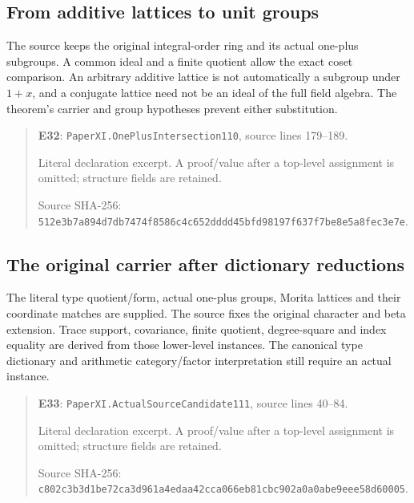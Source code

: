 \documentclass[10pt,oneside]{book}
\begin{document}

\subsection{From additive lattices to unit groups}
\label{guide:E32}
The source keeps the original integral-order ring and its actual one-plus subgroups. A common ideal and a finite quotient allow the exact coset comparison.
An arbitrary additive lattice is not automatically a subgroup under \(1+x\), and a conjugate lattice need not be an ideal of the full field algebra. The theorem's carrier and group hypotheses prevent either substitution.

\begin{quote}\footnotesize\textbf{E32}: \nolinkurl{PaperXI.OnePlusIntersection110}, source lines 179--189.\par Literal declaration excerpt. A proof/value after a top-level assignment is omitted; structure fields are retained.\par Source SHA-256: {\scriptsize\texttt{512e3b7a894d7db7474f8586c4c652dddd45bfd98197f637f7be8e5a8fec3e7e}}.\end{quote}


\subsection{The original carrier after dictionary reductions}
\label{guide:E33}
The literal type quotient/form, actual one-plus groups, Morita lattices and their coordinate matches are supplied. The source fixes the original character and beta extension.
Trace support, covariance, finite quotient, degree-square and index equality are derived from those lower-level instances. The canonical type dictionary and arithmetic category/factor interpretation still require an actual instance.

\begin{quote}\footnotesize\textbf{E33}: \nolinkurl{PaperXI.ActualSourceCandidate111}, source lines 40--84.\par Literal declaration excerpt. A proof/value after a top-level assignment is omitted; structure fields are retained.\par Source SHA-256: {\scriptsize\texttt{c802c3b3d1be72ca3d961a4edaa42cca066eb81cbc902a0a0abe9eee58d60005}}.\end{quote}
\end{document}
